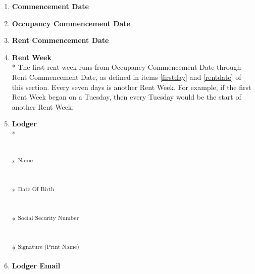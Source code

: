\documentclass[12pt,letterpaper]{article}
\newcommand{\lodger}{Lodger}
\newcommand{\signdate}{Commencement Date}
\newcommand{\firstday}{Occupancy Commencement Date}
\newcommand{\rentdate}{Rent Commencement Date}
\newcommand{\rentweek}{Rent Week}
\newcommand{\lemail}{Lodger Email}
\begin{document}
\begin{multicols}{2}
\begin{enumerate}
			\item \textbf{\signdate{}} \label{signdate}

				\vspace{0.5cm}\makebox[2in]{\hrulefill}

			\item \textbf{\firstday{}} \label{firstday}

				\vspace{0.5cm}\makebox[2in]{\hrulefill}

			\item \textbf{\rentdate{}} \label{rentdate}
				
				\vspace{0.5cm}\makebox[2in]{\hrulefill}

			\item \textbf{\rentweek{}}\\* \label{rentweek}
				The first rent week runs from \firstday{} through \rentdate{}, as defined in items \ref{firstday} and \ref{rentdate} of this section.  Every seven days is another \rentweek{}. For example, if the first \rentweek{} began on a Tuesday, then every Tuesday would be the start of another \rentweek{}.
				
			\item \textbf{\lodger{}}\\* \label{lodger}
				\begin{minipage}[t]{2in}

					\vspace{0.5cm}\makebox[2in]{\hrulefill} \\*
					\textsuperscript{Name}
					
					\vspace{0.5cm}\makebox[2in]{\hrulefill} \\*
					\textsuperscript{Date Of Birth}
					
					\vspace{0.5cm}\makebox[2in]{\hrulefill} \\*
					\textsuperscript{Social Security Number}
					
					\vspace{0.5cm}\makebox[2in]{\hrulefill} \\*
					\textsuperscript{Signature (Print Name)}
				\end{minipage}%

			\item \textbf{\lemail{}} \label{lemail}

				\vspace{0.5cm}\makebox[2in]{\hrulefill}

				\vspace{0.5cm}\makebox[2in]{\hrulefill}
		\end{enumerate}
	\end{multicols}
\end{document}

